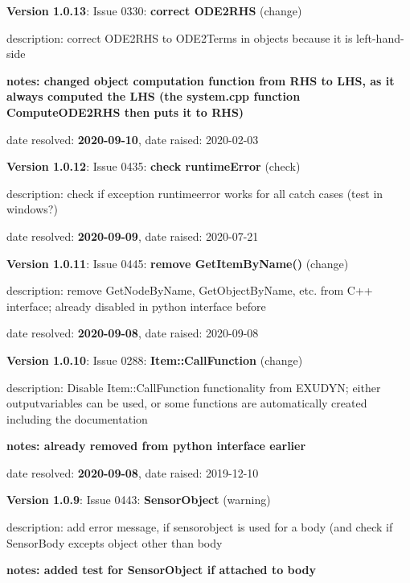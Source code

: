   \item {\bf Version 1.0.13}: \vspace{-6pt} 
  Issue 0330: {\bf correct ODE2RHS}
(change)
  \bi
  \item {\small description: correct ODE2RHS to ODE2Terms in objects because it is left-hand-side}
  \item {\small \bf notes: changed object computation function from RHS to LHS, as it always computed the LHS (the system.cpp function ComputeODE2RHS then puts it to RHS)}
  \item   date resolved: {\bf 2020-09-10},
date raised: 2020-02-03   \ei
  \item {\bf Version 1.0.12}: \vspace{-6pt} 
  Issue 0435: {\bf check runtimeError}
(check)
  \bi
  \item {\small description: check if exception runtimeerror works for all catch cases (test in windows?)}
  \item   date resolved: {\bf 2020-09-09},
date raised: 2020-07-21   \ei
  \item {\bf Version 1.0.11}: \vspace{-6pt} 
  Issue 0445: {\bf remove GetItemByName()}
(change)
  \bi
  \item {\small description: remove GetNodeByName, GetObjectByName, etc. from C++ interface; already disabled in python interface before}
  \item   date resolved: {\bf 2020-09-08},
date raised: 2020-09-08   \ei
  \item {\bf Version 1.0.10}: \vspace{-6pt} 
  Issue 0288: {\bf Item::CallFunction}
(change)
  \bi
  \item {\small description: Disable Item::CallFunction functionality from EXUDYN; either outputvariables can be used, or some functions are automatically created including the documentation}
  \item {\small \bf notes: already removed from python interface earlier}
  \item   date resolved: {\bf 2020-09-08},
date raised: 2019-12-10   \ei
  \item {\bf Version 1.0.9}: \vspace{-6pt} 
  Issue 0443: {\bf SensorObject}
(warning)
  \bi
  \item {\small description: add error message, if sensorobject is used for a body (and check if SensorBody excepts object other than body}
  \item {\small \bf notes: added test for SensorObject if attached to body}
